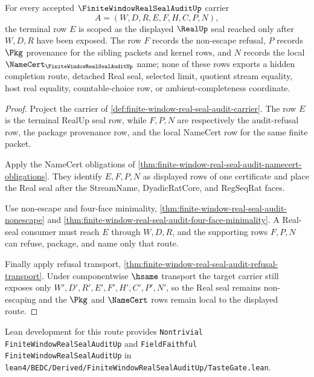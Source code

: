 \begin{theorem}
\label{thm:finite-window-real-seal-audit-real-seal-nonescape-scope}
For every accepted $\FiniteWindowRealSealAuditUp$ carrier
$$
A=(W,D,R,E,F,H,C,P,N),
$$
the terminal row $E$ is scoped as the displayed $\RealUp$ seal reached only after $W,D,R$ have been exposed. The row $F$ records the non-escape refusal, $P$ records $\Pkg$ provenance for the sibling packets and kernel rows, and $N$ records the local $\NameCert_{\FiniteWindowRealSealAuditUp}$ name; none of these rows exports a hidden completion route, detached Real seal, selected limit, quotient stream equality, host real equality, countable-choice row, or ambient-completeness coordinate.
\end{theorem}
\begin{proof}
Project the carrier of \autoref{def:finite-window-real-seal-audit-carrier}. The row $E$ is the terminal RealUp seal row, while $F,P,N$ are respectively the audit-refusal row, the package provenance row, and the local NameCert row for the same finite packet.

Apply the NameCert obligations of \autoref{thm:finite-window-real-seal-audit-namecert-obligations}. They identify $E,F,P,N$ as displayed rows of one certificate and place the Real seal after the StreamName, DyadicRatCore, and RegSeqRat faces.

Use non-escape and four-face minimality, \autoref{thm:finite-window-real-seal-audit-nonescape} and \autoref{thm:finite-window-real-seal-audit-four-face-minimality}. A Real-seal consumer must reach $E$ through $W,D,R$, and the supporting rows $F,P,N$ can refuse, package, and name only that route.

Finally apply refusal transport, \autoref{thm:finite-window-real-seal-audit-refusal-transport}. Under componentwise $\hsame$ transport the target carrier still exposes only $W',D',R',E',F',H',C',P',N'$, so the Real seal remains non-escaping and the $\Pkg$ and $\NameCert$ rows remain local to the displayed route.
\end{proof}

Lean development for this route provides \texttt{Nontrivial FiniteWindowRealSealAuditUp} and \texttt{FieldFaithful FiniteWindowRealSealAuditUp} in \texttt{lean4/BEDC/Derived/FiniteWindowRealSealAuditUp/TasteGate.lean}.

